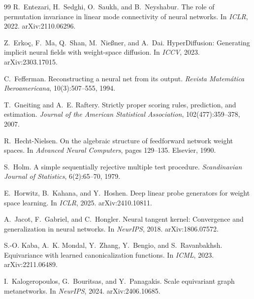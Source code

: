 \documentclass[10pt,twocolumn,letterpaper]{article}
\theoremstyle{definition}
\begin{document}
\begin{thebibliography}{99}
R.~Entezari, H.~Sedghi, O.~Saukh, and B.~Neyshabur.
\newblock The role of permutation invariance in linear mode connectivity of neural networks.
\newblock In \emph{ICLR}, 2022. arXiv:2110.06296.

Z.~Erko\c{c}, F.~Ma, Q.~Shan, M.~Nie\ss{}ner, and A.~Dai.
\newblock HyperDiffusion: Generating implicit neural fields with weight-space diffusion.
\newblock In \emph{ICCV}, 2023. arXiv:2303.17015.

C.~Fefferman.
\newblock Reconstructing a neural net from its output.
\newblock \emph{Revista Matem\'atica Iberoamericana}, 10(3):507--555, 1994.

T.~Gneiting and A.~E. Raftery.
\newblock Strictly proper scoring rules, prediction, and estimation.
\newblock \emph{Journal of the American Statistical Association}, 102(477):359--378, 2007.

R.~Hecht-Nielsen.
\newblock On the algebraic structure of feedforward network weight spaces.
\newblock In \emph{Advanced Neural Computers}, pages 129--135. Elsevier, 1990.

S.~Holm.
\newblock A simple sequentially rejective multiple test procedure.
\newblock \emph{Scandinavian Journal of Statistics}, 6(2):65--70, 1979.

E.~Horwitz, B.~Kahana, and Y.~Hoshen.
\newblock Deep linear probe generators for weight space learning.
\newblock In \emph{ICLR}, 2025. arXiv:2410.10811.

A.~Jacot, F.~Gabriel, and C.~Hongler.
\newblock Neural tangent kernel: Convergence and generalization in neural networks.
\newblock In \emph{NeurIPS}, 2018. arXiv:1806.07572.

S.-O. Kaba, A.~K. Mondal, Y.~Zhang, Y.~Bengio, and S.~Ravanbakhsh.
\newblock Equivariance with learned canonicalization functions.
\newblock In \emph{ICML}, 2023. arXiv:2211.06489.

I.~Kalogeropoulos, G.~Bouritsas, and Y.~Panagakis.
\newblock Scale equivariant graph metanetworks.
\newblock In \emph{NeurIPS}, 2024. arXiv:2406.10685.


\end{thebibliography}
\end{document}
